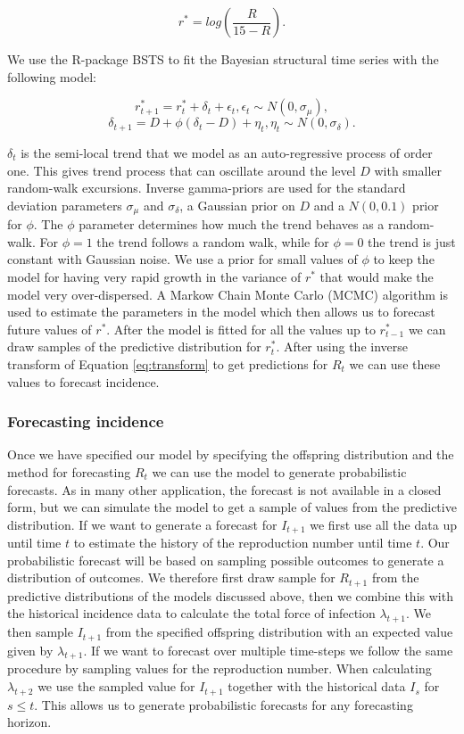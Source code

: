 \documentclass[12pt]{article}
\begin{document}
\begin{equation}
r^* = log\left(\frac{R}{15 - R}\right).
\label{eq:transform}
\end{equation}

We use the R-package BSTS \cite{scottBstsBayesianStructural2019} to fit the Bayesian structural time series with the following model:

\[r^*_{t+1} = r^*_t + \delta_t + \epsilon_t, \epsilon_t \sim N(0, \sigma_\mu),\]
\[\delta_{t+1} = D + \phi(\delta_t - D) + \eta_t, \eta_t \sim N(0, \sigma_\delta).\]

$\delta_t$ is the semi-local trend that we model as an auto-regressive process of order one. This gives trend process that can oscillate around the level $D$ with smaller random-walk excursions. Inverse gamma-priors are used for the standard deviation parameters $\sigma_\mu$ and $\sigma_\delta$, a Gaussian prior on $D$ and a $N(0, 0.1)$ prior for $\phi$. The $\phi$ parameter determines how much the trend behaves as a random-walk. For $\phi=1$ the trend follows a random walk, while for $\phi=0$ the trend is just constant with Gaussian noise. We use a prior for small values of $\phi$ to keep the model for having very rapid growth in the variance of $r^*$ that would make the model very over-dispersed. A Markow Chain Monte Carlo (MCMC) algorithm is used to estimate the parameters in the model which then allows us to forecast future values of $r^*$. After the model is fitted for all the values up to  $r^*_{t-1}$ we can draw samples of the predictive distribution for $r^*_t$. After using the inverse transform of Equation \ref{eq:transform} to get predictions for $R_t$ we can use these values to forecast incidence. 


\subsubsection{Forecasting incidence}

Once we have specified our model by specifying the offspring distribution and the method for forecasting $R_t$ we can use the model to generate probabilistic forecasts. As in many other application, the forecast is not available in a closed form, but we can simulate the model to get a sample of values from the predictive distribution. If we want to generate a forecast for $I_{t+1}$ we first use all the data up until time $t$ to estimate the history of the reproduction number until time $t$. Our probabilistic forecast will be based on sampling possible outcomes to generate a distribution of outcomes. We therefore first draw sample for $R_{t+1}$ from the predictive distributions of the models discussed above, then we combine this with the historical incidence data to calculate the total force of infection $\lambda_{t+1}$. We then sample $I_{t+1}$ from the specified offspring distribution with an expected value given by $\lambda_{t+1}$. If we want to forecast over multiple time-steps we follow the same procedure by sampling values for the reproduction number. When calculating $\lambda_{t+2}$ we use the sampled value for $I_{t+1}$ together with the historical data ${I_s}$ for $s\leq t$. This allows us to generate probabilistic forecasts for any forecasting horizon.
\end{document}
